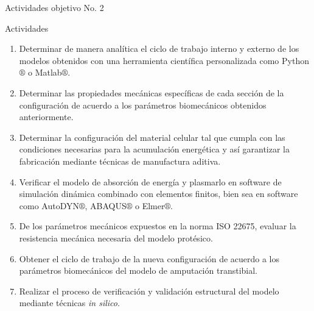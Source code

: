 \documentclass[10pt]{beamer}
\begin{document}
\begin{frame}{Actividades objetivo No. 2}

\begin{block}{Actividades}

\begin{enumerate}
\item {\scriptsize{}Determinar de manera analítica el ciclo de trabajo interno
y externo de los modelos obtenidos con una herramienta científica
personalizada como Python$\circledR$ o Matlab$\circledR$.}{\scriptsize \par}
\item {\scriptsize{}Determinar las propiedades mecánicas específicas de
cada sección de la configuración de acuerdo a los parámetros biomecánicos
obtenidos anteriormente.}{\scriptsize \par}
\item {\scriptsize{}Determinar la configuración del material celular tal
que cumpla con las condiciones necesarias para la acumulación energética
y así garantizar la fabricación mediante técnicas de manufactura aditiva.}{\scriptsize \par}
\item {\scriptsize{}Verificar el modelo de absorción de energía y plasmarlo
en software de simulación dinámica combinado con elementos finitos,
bien sea en software como AutoDYN$\circledR$, ABAQUS$\circledR$
o Elmer$\circledR$.}{\scriptsize \par}
\item {\scriptsize{}De los parámetros mecánicos expuestos en la norma ISO
22675, evaluar la resistencia mecánica necesaria del modelo protésico.}{\scriptsize \par}
\item {\scriptsize{}Obtener el ciclo de trabajo de la nueva configuración
de acuerdo a los parámetros biomecánicos del modelo de amputación
transtibial.}{\scriptsize \par}
\item {\scriptsize{}Realizar el proceso de verificación y validación estructural
del modelo mediante técnicas }\emph{\scriptsize{}in silico}{\scriptsize{}.}{\scriptsize \par}
\end{enumerate}
\end{block}
\end{frame}
\end{document}

